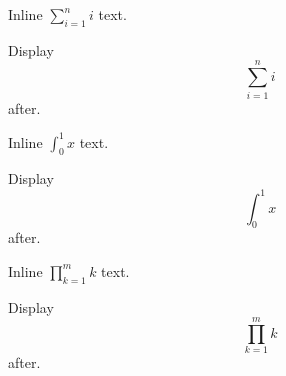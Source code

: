 \documentclass[12pt]{article}
\begin{document}
Inline $\sum_{i=1}^{n} i$ text.

Display \[ \sum_{i=1}^{n} i \] after.

Inline $\int_0^1 x$ text.

Display \[ \int_0^1 x \] after.

Inline $\prod_{k=1}^{m} k$ text.

Display \[ \prod_{k=1}^{m} k \] after.
\end{document}
